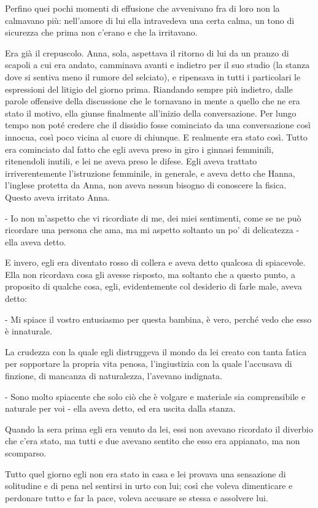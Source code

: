 Perfino quei pochi momenti di effusione che avvenivano fra di loro non la calmavano più: nell'amore di lui ella intravedeva una certa calma, un tono di sicurezza che prima non c'erano e che la irritavano. 

Era già il crepuscolo. Anna, sola, aspettava il ritorno di lui da un pranzo di scapoli a cui era andato, camminava avanti e indietro per il suo studio (la stanza dove si sentiva meno il rumore del selciato), e ripensava in tutti i particolari le espressioni del litigio del giorno prima. Riandando sempre più indietro, dalle parole offensive della discussione che le tornavano in mente a quello che ne era stato il motivo, ella giunse finalmente all'inizio della conversazione. Per lungo tempo non poté credere che il dissidio fosse cominciato da una conversazione così innocua, così poco vicina al cuore di chiunque. E realmente era stato così. Tutto era cominciato dal fatto che egli aveva preso in giro i ginnasi femminili, ritenendoli inutili, e lei ne aveva preso le difese. Egli aveva trattato irriverentemente l'istruzione femminile, in generale, e aveva detto che Hanna, l'inglese protetta da Anna, non aveva nessun bisogno di conoscere la fisica. Questo aveva irritato Anna. 

- Io non m'aspetto che vi ricordiate di me, dei miei sentimenti, come se ne può ricordare una persona che ama, ma mi aspetto soltanto un po' di delicatezza - ella aveva detto. 

E invero, egli era diventato rosso di collera e aveva detto qualcosa di spiacevole. Ella non ricordava cosa gli avesse risposto, ma soltanto che a questo punto, a proposito di qualche cosa, egli, evidentemente col desiderio di farle male, aveva detto: 

- Mi spiace il vostro entusiasmo per questa bambina, è vero, perché vedo che esso è innaturale. 

La crudezza con la quale egli distruggeva il mondo da lei creato con tanta fatica per sopportare la propria vita penosa, l'ingiustizia con la quale l'accusava di finzione, di mancanza di naturalezza, l'avevano indignata. 

- Sono molto spiacente che solo ciò che è volgare e materiale sia comprensibile e naturale per voi - ella aveva detto, ed era uscita dalla stanza. 

Quando la sera prima egli era venuto da lei, essi non avevano ricordato il diverbio che c'era stato, ma tutti e due avevano sentito che esso era appianato, ma non scomparso. 

Tutto quel giorno egli non era stato in casa e lei provava una sensazione di solitudine e di pena nel sentirsi in urto con lui; così che voleva dimenticare e perdonare tutto e far la pace, voleva accusare se stessa e assolvere lui. 

